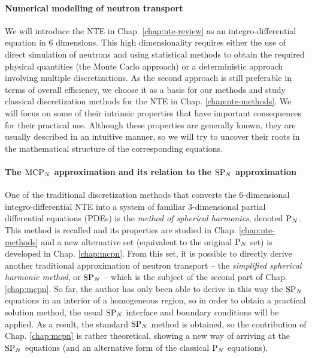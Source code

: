 \paragraph{Numerical modelling of neutron transport}
We will introduce the NTE in Chap. \ref{chap:nte-review} as an integro-differential equation in 6 dimensions.
This high dimensionality requires either the use of direct simulation of neutrons and using statistical methods to obtain the
required physical quantities (the Monte Carlo approach) or a deterministic approach involving multiple discretizations.
As the second approach is still preferable in terms of overall efficiency, we choose it as a basis for our methods and
study classical discretization methods for the NTE in Chap. \ref{chap:nte-methods}. We will focus on some of
their intrinsic properties that have important consequences for their practical use. Although these properties are
generally known, they are usually described in an intuitive manner, so we will try to uncover their roots in the
mathematical structure of the corresponding equations.

\paragraph{The $\text{MCP}_{N}$ approximation and its relation to the $\text{SP}_{N}$ approximation} 
One of the traditional discretization methods that converts the 6-dimensional integro-differential NTE into a system of
familiar 3-dimensional partial differential equations (PDEs) is the
\textit{method of spherical harmonics}, denoted $\text{P}_{N}$. This method is recalled and its properties are
studied in Chap. \ref{chap:nte-methods} and a new alternative set (equivalent to the original $\text{P}_{N}$ set) is developed in
Chap. \ref{chap:mcpn}. From this set, it is possible to directly derive another traditional approximation of neutron
transport -- the \textit{simplified spherical harmonic method}, or $\text{SP}_{N}$  -- which is the subject of the second part of Chap. \ref{chap:mcpn}. So far, the author has only
been able to derive in this way the $\text{SP}_{N}$ equations in an interior of a homogeneous region, so in order to obtain a
practical solution method, the usual $\text{SP}_{N}$ interface and boundary conditions will be applied. As a result, the standard
$\text{SP}_{N}$ method is obtained, so the contribution of Chap. \ref{chap:mcpn} is rather theoretical, showing a new way of
arriving at the $\text{SP}_{N}$ equations (and an alternative form of the classical $\text{P}_{N}$ equations).

